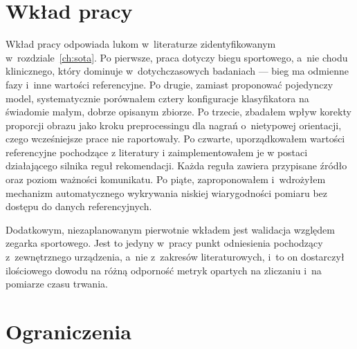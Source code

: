 \section{Wkład pracy}
\label{sec:wklad-pracy}

Wkład pracy odpowiada lukom w~literaturze zidentyfikowanym w~rozdziale~\ref{ch:sota}. Po pierwsze, praca dotyczy biegu sportowego, a~nie chodu klinicznego, który dominuje w~dotychczasowych badaniach --- bieg ma odmienne fazy i~inne wartości referencyjne. Po drugie, zamiast proponować pojedynczy model, systematycznie porównałem cztery konfiguracje klasyfikatora na świadomie małym, dobrze opisanym zbiorze. Po trzecie, zbadałem wpływ korekty proporcji obrazu jako kroku preprocessingu dla nagrań o~nietypowej orientacji, czego wcześniejsze prace nie raportowały. Po czwarte, uporządkowałem wartości referencyjne pochodzące z literatury i zaimplementowałem je w postaci działającego silnika reguł rekomendacji. Każda reguła zawiera przypisane źródło oraz poziom ważności komunikatu.
 Po piąte, zaproponowałem i~wdrożyłem mechanizm automatycznego wykrywania niskiej wiarygodności pomiaru bez dostępu do danych referencyjnych.

Dodatkowym, niezaplanowanym pierwotnie wkładem jest walidacja względem zegarka sportowego. Jest to jedyny w~pracy punkt odniesienia pochodzący z~zewnętrznego urządzenia, a~nie z~zakresów literaturowych, i~to on dostarczył ilościowego dowodu na różną odporność metryk opartych na zliczaniu i~na pomiarze czasu trwania.

\section{Ograniczenia}
\label{sec:ograniczenia-pracy}

